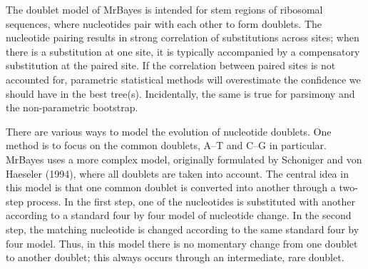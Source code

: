 \documentclass[12pt]{book}
\begin{document}
The doublet model of MrBayes is intended for stem regions of ribosomal sequences, where nucleotides
pair with each other to form doublets. The nucleotide pairing results in strong correlation of
substitutions across sites; when there is a substitution at one site, it is typically accompanied
by a compensatory substitution at the paired site. If the correlation between paired sites is not
accounted for, parametric statistical methods will overestimate the confidence we should have in
the best tree(s). Incidentally, the same is true for parsimony and the non-parametric bootstrap.

There are various ways to model the evolution of nucleotide doublets. One method is to focus on the
common doublets, A--T and C--G in particular. MrBayes uses a more complex model, originally
formulated by Schoniger and von Haeseler (1994), where all doublets are taken into account. The
central idea in this model is that one common doublet is converted into another through a two-step
process. In the first step, one of the nucleotides is substituted with another according to a
standard four by four model of nucleotide change. In the second step, the matching nucleotide is
changed according to the same standard four by four model. Thus, in this model there is no
momentary change from one doublet to another doublet; this always occurs through an intermediate,
rare doublet.
\end{document}
